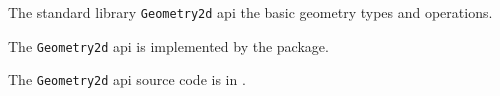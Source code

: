 
The standard library {\tt Geometry2d} api the basic geometry types and operations.

The {\tt Geometry2d} api is implemented by the  package.

The {\tt Geometry2d} api source code is in .

